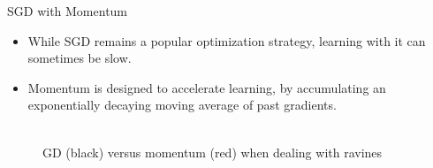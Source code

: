 \begin{vbframe}{SGD with Momentum}
\begin{itemize}
\item While SGD remains a popular optimization strategy, learning with it can sometimes be slow.
\item Momentum is designed to accelerate learning, by accumulating an exponentially decaying moving average of past gradients.
\end{itemize}
\begin{figure}
\centering
{}
\\GD (black) versus momentum (red) when dealing with ravines
\end{figure}
\end{vbframe}

\endlecture
